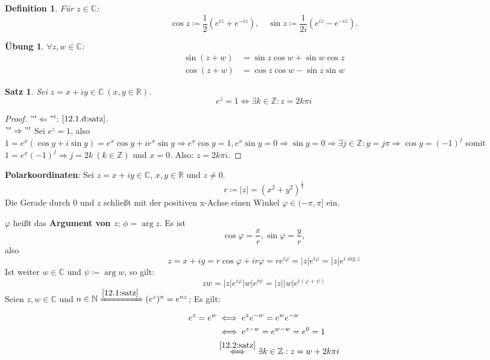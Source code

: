 \documentclass[14pt,titlepage,ngerman,a4paper,headsepline,DIV15,halfparskip*]{scrartcl}
\newcommand{\C}{\mathbb{C}}
\newcommand{\N}{\mathbb{N}}
\newcommand{\R}{\mathbb{R}}
\newcommand{\Z}{\mathbb{Z}}
\theoremstyle{named}
\theoremstyle{dotless}
\newtheorem{satz}[namedtheorem]{Satz}
\newtheorem*{definition}{Definition}
\newtheorem*{uebung}{Übung}
\begin{document}
\begin{definition}
	Für $z \in \C$:
	$$ \cos z \coloneqq \frac{1}{2} \left( e^{iz} + e^{-iz} \right), \quad \sin z \coloneqq \frac{1}{2 i} \left( e^{iz} - e^{-iz} \right). $$
\end{definition}


\begin{uebung}
	$\forall z, w \in \C$:
	\begin{align*}
		\sin (z + w) & = \sin z \cos w + \sin w \cos z \\
		\cos (z + w) & = \cos z \cos w - \sin z \sin w
	\end{align*}	
\end{uebung}


\begin{satz} \label{12.2:satz}
	Sei $z = x + i y \in \C ~(x, y \in \R)$.
	$$ e^{z} = 1 \iff \exists k \in \Z: z = 2 k \pi i $$
\end{satz}

\begin{proof}
	$"' \Leftarrow "'$: $\ref{12.1.d:satz}$. \\
	$"' \Rightarrow "'$ Sei $e^{z} = 1$, also $1 = e^{x} ( \cos y + i \sin y) = e^{x} \cos y + i e^{x} \sin y \Rightarrow e^{x} \cos y = 1, e^{x} \sin y = 0 \Rightarrow \sin y = 0 \Rightarrow \exists j \in \Z: y = j \pi \Rightarrow \cos y = (-1)^{j}$ somit $1 = e^{x} (-1)^{j} \Rightarrow j = 2k ~(k \in \Z)$ und $x = 0$. Also: $z = 2k \pi i$.
\end{proof}

 
\textbf{Polarkoordinaten}: Sei $z = x + iy \in \C$, $x, y \in \R$ und $z \neq 0$.
	$$ r \coloneqq |z| = (x^{2} + y^{2})^{\frac{1}{2}} $$
	Die Gerade durch $0$ und $z$ schließt mit der positiven x-Achse einen Winkel $\varphi \in (-\pi, \pi]$ ein.
	
	$\varphi$ hei{\ss}t das \textbf{Argument von $z$}; $\phi = \arg z$. Es ist
		$$ \cos \varphi = \frac{x}{r}, \sin \varphi = \frac{y}{r}, $$
	also
		$$  z = x + iy = r \cos \varphi + i r \varphi = r e^{i \varphi} = |z| e^{i \varphi} = |z| e^{i \arg z} $$
	Ist weiter $w \in \C$ und $\psi \coloneqq \arg w$, so gilt:
		$$ z w = |z| e^{i \varphi} |w| e^{i \psi} = |z| |w| e^{i(\varphi + \psi)} $$
	Seien $z, w \in \C$ und $n \in \N \xRightarrow[]{\ref{12.1:satz}} (e^{z})^{n} = e^{nz}$; Es gilt:
	\begin{align*}
		e^{z} = e^{w} & \iff e^{z} e^{-w} = e^{w} e^{-w} \\
			& \iff e^{z-w} = e^{w - w} = e^{0} =1 \\
			& \overset{\ref{12.2:satz}}{\iff} \exists k \in \Z: z = w + 2 k \pi i
	\end{align*}
\end{document}
